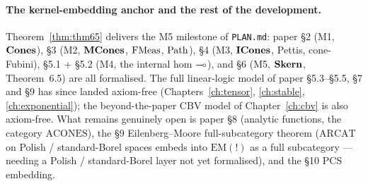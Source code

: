 \paragraph{The kernel-embedding anchor and the rest of the development.}
Theorem~\ref{thm:thm65} delivers the M5 milestone of
\texttt{PLAN.md}: paper \S2 (M1, $\mathbf{Cones}$), \S3 (M2, $\mathbf{MCones}$,
$\mathrm{FMeas}$, $\mathrm{Path}$), \S4 (M3, $\mathbf{ICones}$, Pettis, cone-Fubini), \S5.1
+ \S5.2 (M4, the internal hom $\multimap$), and \S6 (M5, $\mathbf{Skern}$,
Theorem~6.5) are all formalised. The full linear-logic model of
paper \S5.3--\S5.5, \S7 and \S9 has since landed axiom-free
(Chapters~\ref{ch:tensor}, \ref{ch:stable}, \ref{ch:exponential}); the
beyond-the-paper CBV model of Chapter~\ref{ch:cbv} is also axiom-free.
What remains genuinely open is paper \S8 (analytic functions, the
category $\mathrm{ACONES}$), the \S9 Eilenberg--Moore full-subcategory
theorem ($\mathrm{ARCAT}$ on Polish / standard-Borel spaces embeds into
$\mathrm{EM}(\mathord{!})$ as a full subcategory --- needing a
Polish / standard-Borel layer not yet formalised), and the \S10 PCS
embedding.

